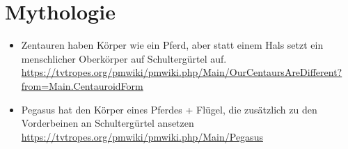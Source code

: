 \section{Mythologie}

\begin{itemize}
 \item Zentauren haben Körper wie ein Pferd, aber statt einem Hals setzt ein menschlicher Oberkörper auf Schultergürtel auf.\\
 \url{https://tvtropes.org/pmwiki/pmwiki.php/Main/OurCentaursAreDifferent?from=Main.CentauroidForm}
 \item Pegasus hat den Körper eines Pferdes + Flügel, die zusätzlich zu den Vorderbeinen an Schultergürtel ansetzen\\
 \url{https://tvtropes.org/pmwiki/pmwiki.php/Main/Pegasus}
\end{itemize}

